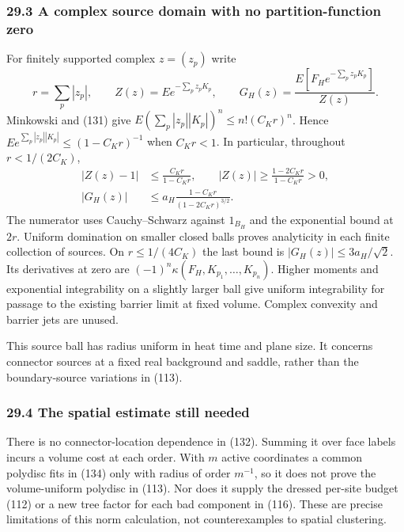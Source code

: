 \documentclass[11pt,a4paper]{article}
\begin{document}
\hypertarget{a-complex-source-domain-with-no-partition-function-zero}{%
\subsubsection{29.3 A complex source domain with no partition-function
zero}\label{a-complex-source-domain-with-no-partition-function-zero}}

For finitely supported complex \(z=(z_p)\) write \[r=\sum_p|z_p|,\qquad
Z(z)=E e^{-\sum_pz_pK_p},\qquad
G_H(z)=\frac{E[F_He^{-\sum_pz_pK_p}]}{Z(z)}.\tag{133}\] Minkowski and
(131) give \(E(\sum_p|z_p||K_p|)^n\le n!(C_Kr)^n\). Hence
\(E e^{\sum_p|z_p||K_p|}\le(1-C_Kr)^{-1}\) when \(C_Kr<1\). In
particular, throughout \(r<1/(2C_K)\), \[\begin{aligned}
|Z(z)-1|&\le\frac{C_Kr}{1-C_Kr},\qquad
|Z(z)|\ge\frac{1-2C_Kr}{1-C_Kr}>0,\\
|G_H(z)|&\le a_H\frac{1-C_Kr}{(1-2C_Kr)^{3/2}}.
\end{aligned}\tag{134}\] The numerator uses Cauchy--Schwarz against
\(1_{B_H}\) and the exponential bound at \(2r\). Uniform domination on
smaller closed balls proves analyticity in each finite collection of
sources. On \(r\le1/(4C_K)\) the last bound is
\(|G_H(z)|\le3a_H/\sqrt2\). Its derivatives at zero are
\((-1)^n\kappa(F_H,K_{p_1},\ldots,K_{p_n})\). Higher moments and
exponential integrability on a slightly larger ball give uniform
integrability for passage to the existing barrier limit at fixed volume.
Complex convexity and barrier jets are unused.

This source ball has radius uniform in heat time and plane size. It
concerns connector sources at a fixed real background and saddle, rather
than the boundary-source variations in (113).

\hypertarget{the-spatial-estimate-still-needed}{%
\subsubsection{29.4 The spatial estimate still
needed}\label{the-spatial-estimate-still-needed}}

There is no connector-location dependence in (132). Summing it over face
labels incurs a volume cost at each order. With \(m\) active coordinates
a common polydisc fits in (134) only with radius of order \(m^{-1}\), so
it does not prove the volume-uniform polydisc in (113). Nor does it
supply the dressed per-site budget (112) or a new tree factor for each
bad component in (116). These are precise limitations of this norm
calculation, not counterexamples to spatial clustering.
\end{document}

